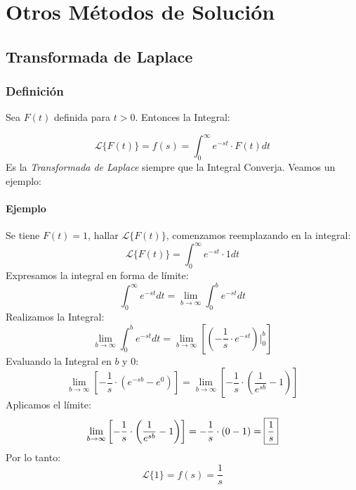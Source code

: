 \chapter{Otros Métodos de Solución}
\section{Transformada de Laplace}
\subsection*{Definición} Sea $F(t)$ definida para $t>0$. Entonces la Integral:

$$\mathscr{L} \lbrace F(t)\rbrace = f(s) = \displaystyle\int_{0}^{\infty} e^{-st}\cdot F(t) dt$$
Es la \textit{Transformada de Laplace} siempre que la Integral Converja. Veamos un ejemplo: 
\subsubsection*{Ejemplo}
Se tiene $F(t)=1$, hallar $\mathscr{L} \lbrace F(t)\rbrace$, comenzamos reemplazando en la integral:
$$\mathscr{L} \lbrace F(t)\rbrace=\displaystyle\int_{0}^{\infty} e^{-st}\cdot 1 dt$$
Expresamos la integral en forma de límite:
$$\displaystyle\int_{0}^{\infty} e^{-st} dt = \lim_{b\to\infty} \displaystyle\int_{0}^{b} e^{-st} dt$$
Realizamos la Integral:
$$\lim_{b\to\infty} \displaystyle\int_{0}^{b} e^{-st} dt = \lim_{b\to\infty}\left[ \left( -\dfrac{1}{s}\cdot e^{-st} \right)\Bigg|_0^b \right] $$
Evaluando la Integral en $b$ y $0$:
$$\lim_{b\to\infty}\left[  -\dfrac{1}{s}\cdot \left( e^{-sb} - e^0\right) \right] = \lim_{b\to\infty}\left[  -\dfrac{1}{s}\cdot \left( \dfrac{1}{e^{sb}} - 1\right) \right] $$
Aplicamos el límite:
$$\lim_{b\to\infty}\left[  -\dfrac{1}{s}\cdot \left( \dfrac{1}{e^{sb}} - 1\right) \right]=-\dfrac{1}{s}\cdot(0-1)= \fbox{$\dfrac{1}{s}$}$$
Por lo tanto:
$$\mathscr{L} \lbrace 1\rbrace=f(s)=\dfrac{1}{s}$$
\pagebreak
